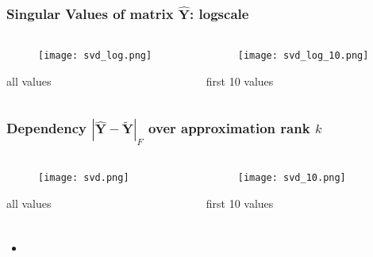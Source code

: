 \documentclass{beamer}
\newcommand{\mY}{\mathbf{Y}}
\begin{document}
\begin{frame}
\frametitle{Singular Values of matrix $\hat{\mY}$: logscale}
\begin{columns}[T] %
\begin{column}{.48\textwidth}
\begin{figure}[h] 
    \texttt{[image: svd\_log.png]}
\end{figure}
all values
\end{column}%
\hfill%
\begin{column}{.48\textwidth}
\begin{figure}[h] 
    \texttt{[image: svd\_log\_10.png]}
\end{figure}
first 10 values
\end{column}%
\end{columns}
\end{frame}

\begin{frame}
\frametitle{Dependency $|\hat{\mY} - \tilde{\mY}|_F$ over approximation rank
$k$}

\begin{columns}[T] %
\begin{column}{.48\textwidth}
\begin{figure}[h] 
    \texttt{[image: svd.png]}
\end{figure}
all values
\end{column}%
\hfill%
\begin{column}{.48\textwidth}
\begin{figure}[h] 
    \texttt{[image: svd\_10.png]}
\end{figure}
first 10 values
\end{column}%
\end{columns}
\end{frame}


\begin{frame}[allowframebreaks]


\end{frame}

\begin{frame}
\frametitle{}
\framesubtitle{}
\begin{itemize}
  \item 
\end{itemize}
\end{frame}
\end{document}
